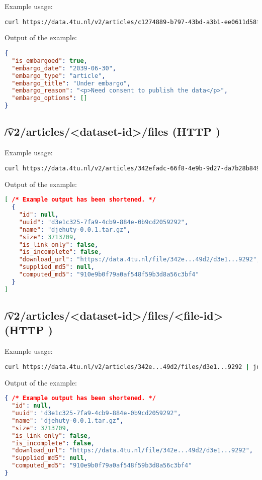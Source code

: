   Example usage:
\begin{lstlisting}[language=bash]
curl https://data.4tu.nl/v2/articles/c1274889-b797-43bd-a3b1-ee0611d58fd7/versions/2/embargo | jq
\end{lstlisting}

  Output of the example:
\begin{lstlisting}[language=JSON]
{
  "is_embargoed": true,
  "embargo_date": "2039-06-30",
  "embargo_type": "article",
  "embargo_title": "Under embargo",
  "embargo_reason": "<p>Need consent to publish the data</p>",
  "embargo_options": []
}
\end{lstlisting}


\subsection{\t{/v2/articles/<dataset-id>/files} (HTTP )}


  Example usage:
\begin{lstlisting}[language=bash]
curl https://data.4tu.nl/v2/articles/342efadc-66f8-4e9b-9d27-da7b28b849d2/files
\end{lstlisting}

  Output of the example:
\begin{lstlisting}[language=JSON]
[ /* Example output has been shortened. */
  {
    "id": null,
    "uuid": "d3e1c325-7fa9-4cb9-884e-0b9cd2059292",
    "name": "djehuty-0.0.1.tar.gz",
    "size": 3713709,
    "is_link_only": false,
    "is_incomplete": false,
    "download_url": "https://data.4tu.nl/file/342e...49d2/d3e1...9292",
    "supplied_md5": null,
    "computed_md5": "910e9b0f79a0af548f59b3d8a56c3bf4"
  }
]
\end{lstlisting}

\subsection{\t{/v2/articles/<dataset-id>/files/<file-id>} (HTTP )}

  Example usage:
\begin{lstlisting}[language=bash]
curl https://data.4tu.nl/v2/articles/342e...49d2/files/d3e1...9292 | jq
\end{lstlisting}

  Output of the example:
\begin{lstlisting}[language=JSON]
{ /* Example output has been shortened. */
  "id": null,
  "uuid": "d3e1c325-7fa9-4cb9-884e-0b9cd2059292",
  "name": "djehuty-0.0.1.tar.gz",
  "size": 3713709,
  "is_link_only": false,
  "is_incomplete": false,
  "download_url": "https://data.4tu.nl/file/342e...49d2/d3e1...9292",
  "supplied_md5": null,
  "computed_md5": "910e9b0f79a0af548f59b3d8a56c3bf4"
}
\end{lstlisting}
